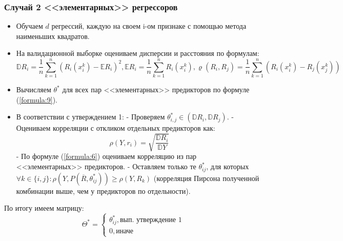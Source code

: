 \documentclass{article}
\begin{document}
\subsubsection{Случай 2 <<элементарных>> регрессоров}
\begin{itemize}
    \item Обучаем $d$ регрессий, каждую на своем i-ом признаке с помощью метода наименьших квадратов.
    \item На валидационной выборке оцениваем дисперсии и расстояния по формулам: $$
    \mathbb{D}R_i = \frac{1}{n} \sum_{k=1}^n (R_i(x^k_i) - \mathbb{E}R_i)^2, \mathbb{E}R_i = \frac{1}{n} \sum_{k=1}^n R_i(x^k_i), \varrho(R_{i}, R_{j}) = \frac{1}{n} \sum_{k=1}^n (R_i(x^k_i) - R_j(x^k_j))
    $$
    \item Вычисляем $\theta^*$ для всех пар <<элементарных>> предикторов по формуле (\ref{formula:9}).
    \item В соответствии с утверждением 1:
    \subitem - Проверяем $\theta^*_{i,j} \in (\mathbb{D}R_i, \mathbb{D}R_j)$.
    \subitem - Оцениваем корреляции с откликом отдельных предикторов как: 
    $$
        \rho(Y, r_i) = \sqrt{\frac{\mathbb{D}R_i}{\mathbb{D}Y}}
    $$
    \subitem - По формуле (\ref{formula:6}) оцениваем корреляцию из пар <<элементарных>> предикторов.
    \subitem - Оставляем только те $\theta^*_{ij}$, для которых $\forall k \in \{i, j\}: \rho(Y, P(\overline{R}, \theta_{ij}^*)) \geq \rho(Y, R_k)$ (корреляция Пирсона полученной комбинации выше, чем у предикторов по отдельности).
\end{itemize}
По итогу имеем матрицу: \\
$$
\Theta^* = 
\begin{cases}
    \theta^*_{ij}, \text{вып. утверждение 1} \\
    0, \text{иначе}
\end{cases}
$$
\end{document}
